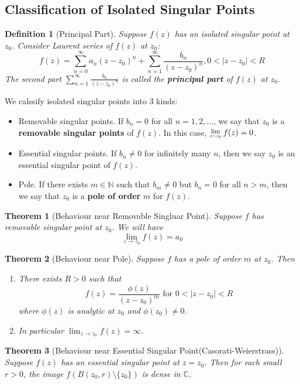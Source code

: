 \documentclass[12pt]{article}
\newcommand{\Res}[1]{\raisebox{0.5ex}{\scalebox{0.8}{$\displaystyle \lim_{#1}\;$}}}
\newtheorem{definition}{Definition}[section]
\newtheorem{theorem}{Theorem}[section]
\theoremstyle{definition}
\begin{document}
\subsection{Classification of Isolated Singular Points}
\begin{definition}[Principal Part]
\normalfont Suppose $f(z)$ has an isolated singular point at $z_0$. Consider Laurent series of $f(z)$ at $z_0$:
\[
f(z) = \sum_{n=0}^\infty a_n(z-z_0)^n + \sum_{n=1}^\infty \frac{b_n}{(z-z_0)^n}, 0<|z-z_0|<R
\]
The second part $\sum_{n=1}^\infty \frac{b_n}{(z-z_0)^n}$ is called the \textbf{principal part} of $f(z)$ at $z_0$.
\end{definition}
We calssify isolated singular points into 3 kinds:
\begin{itemize}
	\item Removable singular points. If $b_n=0$ for all $n=1,2,\ldots$, we say that $z_0$ is a \textbf{removable singular points} of $f(z)$. In this case, $\Res{z=z_0}f(z)=0$.
	\item Essential singular points. If $b_n\neq 0$ for infinitely many $n$, then we say $z_0$ is an essential singular point of $f(z)$.
	\item Pole. If there exists $m\in \mathbb{N}$ such that $b_m\neq 0$ but $b_n=0$ for all $n>m$, then we say that $z_0$ is a \textbf{pole of order} $m$ for $f(z)$.
\end{itemize}
\begin{theorem}[Behaviour near Removable Singluar Point]
\normalfont Suppose $f$ has removable singular point at $z_0$. We will have
\[
\lim_{z\to z_0}f(z) = a_0
\]
\end{theorem}
\begin{theorem}[Behaviour near Pole]
\normalfont Suppose $f$ has a pole of order $m$ at $z_0$. Then 
\begin{enumerate}
	\item There exists $R>0$ such that
	\[
f(z)=\frac{\phi(z)}{(z-z_0)^m}\text{ for }0<|z-z_0|<R
	\]
where $\phi(z)$ is analytic at $z_0$ and $\phi(z_0)\neq 0$.
	\item In particular $\lim_{z\to z_0} f(z) = \infty$.
\end{enumerate}
\end{theorem}
\begin{theorem}[Behaviour near Essential Singular Point(Casorati-Weierstrass)]
\normalfont Suppose $f(z)$ has an essential singular point at $z=z_0$. Then for each small $r>0$, the image $f(B(z_0, r)\setminus \{z_0\})$ is dense in $\mathbb{C}$.
\end{theorem}
\end{document}

